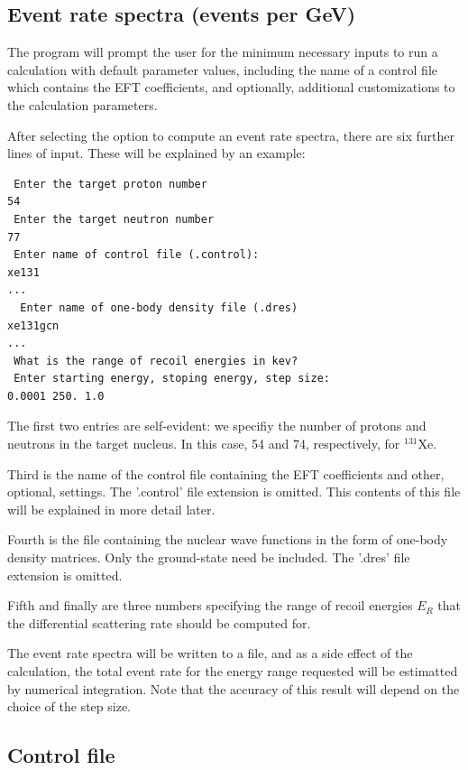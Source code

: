 \documentclass[12pt]{article}
\begin{document}
\subsection{Event rate spectra (events per GeV)}
The program will prompt the user for 
the minimum necessary inputs to run a calculation with default parameter 
values, including the name of a control file which contains the EFT
coefficients, and optionally, additional customizations to the calculation
parameters.

After selecting the option to compute an event rate spectra, there are six
further lines of input. These will be explained by an example:

\begin{verbatim}
 Enter the target proton number
54
 Enter the target neutron number 
77 
 Enter name of control file (.control):
xe131
...
  Enter name of one-body density file (.dres)
xe131gcn
...
 What is the range of recoil energies in kev?
 Enter starting energy, stoping energy, step size:
0.0001 250. 1.0
\end{verbatim}

The first two entries are self-evident: we specifiy the number of protons and
neutrons in the target nucleus. In this case, 54 and 74, respectively, for
$^{131}$Xe.

Third is the name of the control file containing the EFT coefficients and other,
optional, settings. The '.control' file extension is omitted. This contents of
this file will be explained in more detail later.

Fourth is the file containing the nuclear wave functions in the form of one-body
density matrices. Only the ground-state need be included. The '.dres' file
extension is omitted. 

Fifth and finally are three numbers specifying the range of recoil energies
$E_R$ that the differential scattering rate should be computed for.

The event rate spectra will be written to a file, and as a side effect of the
calculation, the total event rate for the energy range requested will be
estimatted by numerical integration. Note that the accuracy of this result will
depend on the choice of the step size.

\subsection{Control file}
\end{document}
